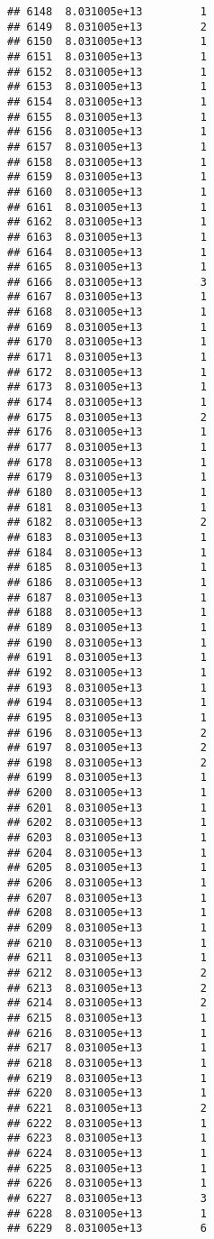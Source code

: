 \documentclass[
]{article}
\begin{document}
\begin{verbatim}
## 6148  8.031005e+13         1
## 6149  8.031005e+13         2
## 6150  8.031005e+13         1
## 6151  8.031005e+13         1
## 6152  8.031005e+13         1
## 6153  8.031005e+13         1
## 6154  8.031005e+13         1
## 6155  8.031005e+13         1
## 6156  8.031005e+13         1
## 6157  8.031005e+13         1
## 6158  8.031005e+13         1
## 6159  8.031005e+13         1
## 6160  8.031005e+13         1
## 6161  8.031005e+13         1
## 6162  8.031005e+13         1
## 6163  8.031005e+13         1
## 6164  8.031005e+13         1
## 6165  8.031005e+13         1
## 6166  8.031005e+13         3
## 6167  8.031005e+13         1
## 6168  8.031005e+13         1
## 6169  8.031005e+13         1
## 6170  8.031005e+13         1
## 6171  8.031005e+13         1
## 6172  8.031005e+13         1
## 6173  8.031005e+13         1
## 6174  8.031005e+13         1
## 6175  8.031005e+13         2
## 6176  8.031005e+13         1
## 6177  8.031005e+13         1
## 6178  8.031005e+13         1
## 6179  8.031005e+13         1
## 6180  8.031005e+13         1
## 6181  8.031005e+13         1
## 6182  8.031005e+13         2
## 6183  8.031005e+13         1
## 6184  8.031005e+13         1
## 6185  8.031005e+13         1
## 6186  8.031005e+13         1
## 6187  8.031005e+13         1
## 6188  8.031005e+13         1
## 6189  8.031005e+13         1
## 6190  8.031005e+13         1
## 6191  8.031005e+13         1
## 6192  8.031005e+13         1
## 6193  8.031005e+13         1
## 6194  8.031005e+13         1
## 6195  8.031005e+13         1
## 6196  8.031005e+13         2
## 6197  8.031005e+13         2
## 6198  8.031005e+13         2
## 6199  8.031005e+13         1
## 6200  8.031005e+13         1
## 6201  8.031005e+13         1
## 6202  8.031005e+13         1
## 6203  8.031005e+13         1
## 6204  8.031005e+13         1
## 6205  8.031005e+13         1
## 6206  8.031005e+13         1
## 6207  8.031005e+13         1
## 6208  8.031005e+13         1
## 6209  8.031005e+13         1
## 6210  8.031005e+13         1
## 6211  8.031005e+13         1
## 6212  8.031005e+13         2
## 6213  8.031005e+13         2
## 6214  8.031005e+13         2
## 6215  8.031005e+13         1
## 6216  8.031005e+13         1
## 6217  8.031005e+13         1
## 6218  8.031005e+13         1
## 6219  8.031005e+13         1
## 6220  8.031005e+13         1
## 6221  8.031005e+13         2
## 6222  8.031005e+13         1
## 6223  8.031005e+13         1
## 6224  8.031005e+13         1
## 6225  8.031005e+13         1
## 6226  8.031005e+13         1
## 6227  8.031005e+13         3
## 6228  8.031005e+13         1
## 6229  8.031005e+13         6

\end{verbatim}
\end{document}
